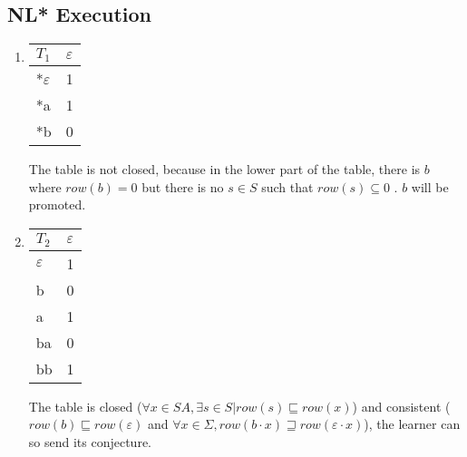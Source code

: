 \subsection{NL* Execution}
\begin{enumerate}
  \item \begin{minipage}{0.3\textwidth}
          \begin{tabular}{l||l}
            $T_1$                       & $\varepsilon$ \\
            \hline\hline
            *$\varepsilon$\footnotemark & 1             \\
            \hline\hline
            *a                          & 1             \\
            *b                          & 0             \\
          \end{tabular}
        \end{minipage}  \quad
        \begin{minipage}{0.6\textwidth}
          The table is not closed, because in the lower part of the table, there is $b$ where $row(b) = 0$ but there is no $s \in S$ such that $row(s) \subseteq 0$ . $b$ will be promoted.
        \end{minipage}
  \item \begin{minipage}{0.3\textwidth}
          \begin{tabular}{l||l}
            $T_2$         & $\varepsilon$ \\
            \hline\hline
            $\varepsilon$ & 1             \\
            b             & 0             \\
            \hline\hline
            a             & 1             \\
            ba            & 0             \\
            bb            & 1             \\
          \end{tabular}
        \end{minipage}\quad
        \begin{minipage}{0.6\textwidth}
          The table is closed ($\forall x \in SA, \exists s \in S | row(s) \sqsubseteq row(x)$) and consistent ($row(b) \sqsubseteq row(\varepsilon)$ and $\forall x \in \Sigma, row(b \cdot x) \sqsupseteq row(\varepsilon \cdot x)$), the learner can so send its conjecture.
        \end{minipage}


\end{enumerate}
